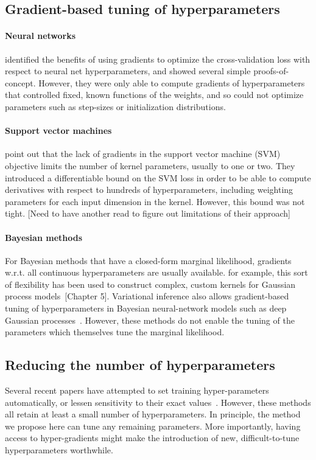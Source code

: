 \documentclass{article}
\begin{document}
\subsection{Gradient-based tuning of hyperparameters}

\paragraph{Neural networks}
\citet{bengio2000gradient, larsen1998adaptive} identified the benefits of using gradients to optimize the cross-validation loss with respect to neural net hyperparameters, and showed several simple proofs-of-concept.
However, they were only able to compute gradients of hyperparameters that controlled fixed, known functions of the weights, and so could not optimize parameters such as step-sizes or initialization distributions.

\paragraph{Support vector machines}
\citet{chapelle2002choosing} point out that the lack of gradients in the support vector machine (SVM) objective limits the number of kernel parameters, usually to one or two.
They introduced a differentiable bound on the SVM loss in order to be able to compute derivatives with respect to hundreds of hyperparameters, including weighting parameters for each input dimension in the kernel.
However, this bound was not tight. [Need to have another read to figure out limitations of their approach]

\paragraph{Bayesian methods}
For Bayesian methods that have a closed-form marginal likelihood, gradients w.r.t. all continuous hyperparameters are usually available.
for example, this sort of flexibility has been used to construct complex, custom kernels for Gaussian process models~\cite{rasmussen38gaussian}[Chapter 5].
Variational inference also allows gradient-based tuning of hyperparameters in Bayesian neural-network models such as deep Gaussian processes~\citep{deepGPVar14}.
However, these methods do not enable the tuning of the parameters which themselves tune the marginal likelihood.

\subsection{Reducing the number of hyperparameters}
Several recent papers have attempted to set training hyper-parameters automatically, or lessen sensitivity to their exact values~\cite{schaul2012no, Adam14, Adasecant14, Hotswap14}.
However, these methods all retain at least a small number of hyperparameters.
In principle, the method we propose here can tune any remaining parameters.
More importantly, having access to hyper-gradients might make the introduction of new, difficult-to-tune hyperparameters worthwhile.
\end{document}
